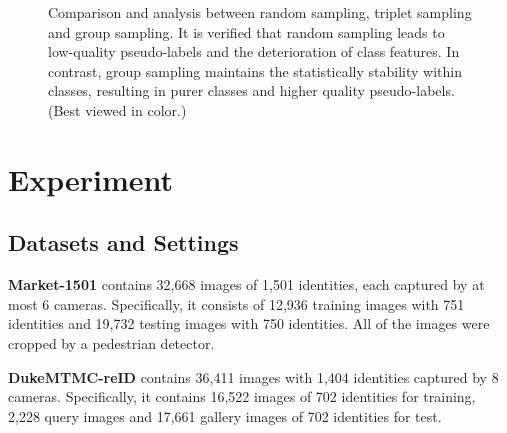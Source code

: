 \documentclass[lettersize,journal]{IEEEtran}
\begin{document}
\begin{figure*}[t]
\begin{center}
\vspace{-2pt}
\caption{Comparison and analysis between random sampling, triplet sampling and group sampling. It is verified that random sampling leads to low-quality pseudo-labels and the deterioration of class features. In contrast, group sampling maintains the statistically stability within classes, resulting in purer classes and higher quality pseudo-labels. (Best viewed in color.)}
\label{fig:analysis1}
\end{center}
\end{figure*}

\section{Experiment}

\subsection{Datasets and Settings} \label{sec:datesets}

\textbf{Market-1501} \cite{Market} contains 32,668 images of 1,501 identities, each captured by at most 6 cameras. Specifically, it consists of 12,936 training images with 751 identities and 19,732 testing images with 750 identities. All of the images were cropped by a pedestrian detector.

\textbf{DukeMTMC-reID} \cite{Duke} contains 36,411 images with 1,404 identities captured by 8 cameras. Specifically, it contains 16,522 images of 702 identities for training, 2,228 query images and 17,661 gallery images of 702 identities for test.
\end{document}
